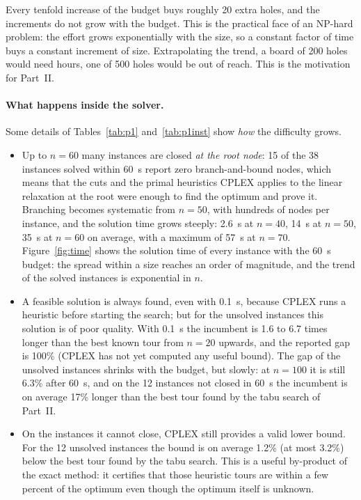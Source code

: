 \documentclass[11pt,a4paper]{article}
\begin{document}
Every tenfold increase of the budget buys roughly 20 extra holes, and the increments do not
grow with the budget. This is the practical face of an NP-hard problem: the effort grows
exponentially with the size, so a constant factor of time buys a constant increment of size.
Extrapolating the trend, a board of 200 holes would need hours, one of 500 holes would be out
of reach. This is the motivation for Part~II.

\paragraph{What happens inside the solver.}
Some details of Tables~\ref{tab:p1} and~\ref{tab:p1inst} show \emph{how} the difficulty grows.
\begin{itemize}
  \item Up to $n=60$ many instances are closed \emph{at the root node}: 15 of the 38 instances
    solved within 60~s report zero branch-and-bound nodes, which means that the cuts and the
    primal heuristics CPLEX applies to the linear relaxation at the root were enough to find
    the optimum and prove it. Branching becomes systematic from $n=50$, with hundreds of nodes
    per instance, and the solution time grows steeply: 2.6~s at $n=40$, 14~s at $n=50$, 35~s at
    $n=60$ on average, with a maximum of 57~s at $n=70$. Figure~\ref{fig:time} shows the
    solution time of every instance with the 60~s budget: the spread within a size reaches
    an order of magnitude, and the trend of the solved instances is exponential in $n$.
  \item A feasible solution is always found, even with 0.1~s, because CPLEX runs a heuristic
    before starting the search; but for the unsolved instances this solution is of poor
    quality. With 0.1~s the incumbent is 1.6 to 6.7 times longer than the best known tour from
    $n=20$ upwards, and the reported gap is 100\% (CPLEX has not yet computed any useful bound).
    The gap of the unsolved instances shrinks with the budget, but slowly: at $n=100$ it is
    still 6.3\% after 60~s, and on the 12 instances not closed in 60~s the incumbent is on
    average 17\% longer than the best tour found by the tabu search of Part~II.
  \item On the instances it cannot close, CPLEX still provides a valid lower bound. For the 12
    unsolved instances the bound is on average 1.2\% (at most 3.2\%) below the best tour found
    by the tabu search. This is a useful by-product of the exact method: it certifies that
    those heuristic tours are within a few percent of the optimum even though the optimum
    itself is unknown.
\end{itemize}
\end{document}
